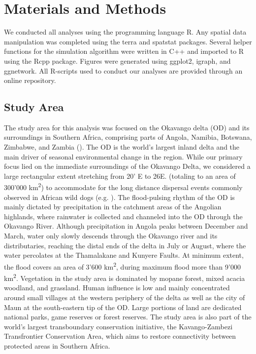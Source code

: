 \documentclass[abstract=on,10pt,a4paper,bibliography=totocnumbered]{article}
\begin{document}
\section{Materials and Methods}
We conducted all analyses using the programming language \textsf{R}. Any spatial
data manipulation was completed using the \textsf{terra} and \textsf{spatstat}
packages. Several helper functions for the simulation algorithm were written in
\textsf{C++} and imported to R using the \textsf{Rcpp} package. Figures were
generated using \textsf{ggplot2}, \textsf{igraph}, and \textsf{ggnetwork}. All
R-scripts used to conduct our analyses are provided through an online
repository.

\subsection{Study Area}
The study area for this analysis was focused on the Okavango delta (OD) and its
surroundings in Southern Africa, comprising parts of Angola, Namibia, Botswana,
Zimbabwe, and Zambia (). The OD is the world's largest inland
delta and the main driver of seasonal environmental change in the region. While
our primary focus lied on the immediate surroundings of the Okavango Delta, we
considered a large rectangular extent stretching from 20' E to
26\degree E. (totaling to an area of 300'000 km\textsuperscript{2}) to
accommodate for the long distance dispersal events commonly observed in African
wild dogs (e.g. \citealp{Davies-Mostert.2012, Masenga.2016, Cozzi.2020}). The
flood-pulsing rhythm of the OD is mainly dictated by precipitation in the
catchment areas of the Angolian highlands, where rainwater is collected and
channeled into the OD through the Okavango River. Although precipitation in
Angola peaks between December and March, water only slowly descends through the
Okavango river and its distributaries, reaching the distal ends of the delta in
July or August, where the water percolates at the Thamalakane and Kunyere
Faults. At minimum extent, the flood covers an area of 3'600
km\textsuperscript{2}, during maximum flood more than 9'000
km\textsuperscript{2}. Vegetation in the study area is dominated by mopane
forest, mixed acacia woodland, and grassland. Human influence is low and mainly
concentrated around small villages at the western periphery of the delta as well
as the city of Maun at the south-eastern tip of the OD. Large portions of land
are dedicated national parks, game reserves or forest reserves. The study area
is also part of the world's largest transboundary conservation initiative, the
Kavango-Zambezi Transfrontier Conservation Area, which aims to restore
connectivity between protected areas in Southern Africa.
\end{document}
